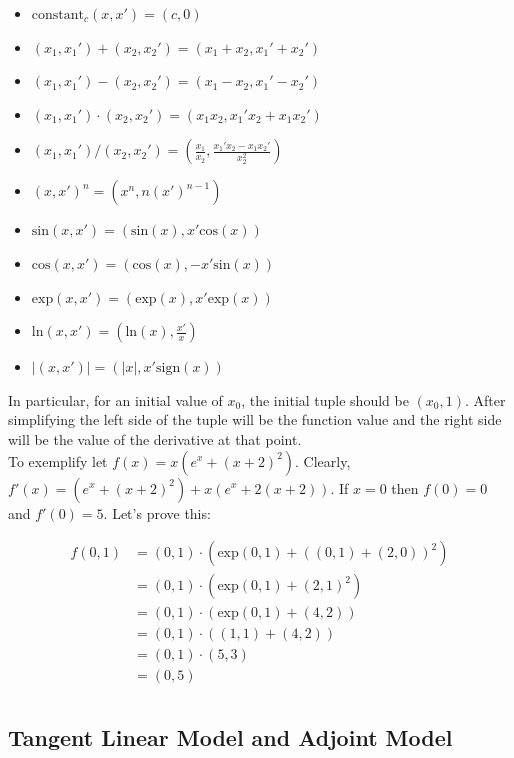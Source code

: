 \documentclass{article}
\begin{document}
\begin{itemize}
\item $\text{constant}_c (x, x') = (c, 0)$
\item $(x_1, x_1') + (x_2, x_2') = (x_1 + x_2, x_1' + x_2')$
\item $(x_1, x_1') - (x_2, x_2') = (x_1 - x_2, x_1' - x_2')$
\item $(x_1, x_1') \cdot (x_2, x_2') = (x_1 x_2, x_1' x_2 + x_1 x_2')$
\item $(x_1, x_1') / (x_2, x_2') = (\frac{x_1}{x_2}, \frac{x_1' x_2 - x_1 x_2'}{x_2^2})$
\item $(x, x')^n = (x^n, n (x')^{n - 1})$
\item $\text{sin} (x, x') = (\text{sin} (x), x' \text{cos} (x))$
\item $\text{cos} (x, x') = (\text{cos} (x), - x' \text{sin} (x))$
\item $\text{exp} (x, x') = (\text{exp} (x), x' \text{exp} (x))$
\item $\text{ln} (x, x') = (\text{ln} (x), \frac{x'}{x})$
\item $|(x, x')| = (|x|, x' \text{sign} (x))$
\end{itemize}

In particular, for an initial value of $x_0$, the initial tuple should be $(x_0, 1)$. After simplifying the left side of the tuple will be the function value and the right side will be the value of the derivative at that point. \\

To exemplify let $f(x) = x (e^x + (x + 2) ^ 2)$. Clearly, $f'(x) = (e^x + (x + 2) ^ 2) + x (e^x + 2 (x + 2))$. If $x = 0$ then $f(0) = 0$ and $f'(0) = 5$. Let's prove this:

\begin{align*}
f(0, 1) &= (0, 1) \cdot (\text{exp} (0, 1) + ((0, 1) + (2, 0))^2) \\
&= (0, 1) \cdot (\text{exp} (0, 1) + (2, 1)^2) \\
&= (0, 1) \cdot (\text{exp} (0, 1) + (4, 2)) \\
&= (0, 1) \cdot ((1, 1) + (4, 2)) \\
&= (0, 1) \cdot (5, 3) \\
&= (0, 5) \\
\end{align*}

\subsection{Tangent Linear Model and Adjoint Model}
\end{document}
